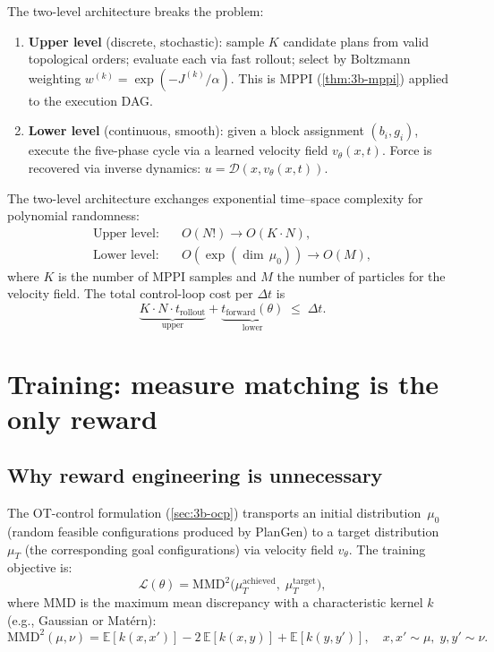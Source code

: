 The two-level architecture breaks the problem:

\begin{definition}\label{def:m-twolevel}
\leavevmode
\begin{enumerate}[label=(\roman*),nosep]
  \item \textbf{Upper level} (discrete, stochastic): sample $K$
  candidate plans from valid topological orders; evaluate each via
  fast rollout; select by Boltzmann weighting
  $w^{(k)} = \exp(-J^{(k)}/\alpha)$.  This is MPPI
  (\cref{thm:3b-mppi}) applied to the execution DAG.
  \item \textbf{Lower level} (continuous, smooth): given a block
  assignment $(b_i, g_i)$, execute the five-phase cycle via a
  learned velocity field $v_\theta(x,t)$.  Force is recovered via
  inverse dynamics: $u = \mathcal{D}(x, v_\theta(x,t))$.
\end{enumerate}
\end{definition}

\begin{proposition}
\label{prop:m-exchange}
The two-level architecture exchanges exponential time--space
complexity for polynomial randomness:
\begin{align}
  \text{Upper level:}\quad & O(N!) \to O(K \cdot N),
    \label{eq:m-upper-complex} \\
  \text{Lower level:}\quad & O(\exp(\dim\,\mu_0)) \to O(M),
    \label{eq:m-lower-complex}
\end{align}
where $K$ is the number of MPPI samples and $M$ the number of
particles for the velocity field.  The total control-loop cost
per $\Delta t$ is
\[
  \underbrace{K \cdot N \cdot t_\mathrm{rollout}}_{\text{upper}}
  + \underbrace{t_\mathrm{forward}(\theta)}_{\text{lower}}
  \;\leq\; \Delta t.
\]
\end{proposition}


\section{Training: measure matching is the only reward}
\label{sec:m-training}

\subsection{Why reward engineering is unnecessary}

The OT-control formulation (\cref{sec:3b-ocp}) transports an
initial distribution~$\mu_0$ (random feasible configurations
produced by PlanGen) to a target distribution~$\mu_T$ (the
corresponding goal configurations) via velocity field $v_\theta$.
The training objective is:
\begin{equation}\label{eq:m-loss}
  \mathcal{L}(\theta)
  = \mathrm{MMD}^2\!\bigl(\mu_T^{\mathrm{achieved}},\;
    \mu_T^{\mathrm{target}}\bigr),
\end{equation}
where $\mathrm{MMD}$ is the maximum mean discrepancy with a
characteristic kernel $k$ (e.g., Gaussian or Mat\'ern):
\[
  \mathrm{MMD}^2(\mu, \nu)
  = \mathbb{E}[k(x,x')] - 2\,\mathbb{E}[k(x,y)]
  + \mathbb{E}[k(y,y')],
  \quad x,x' \sim \mu,\; y,y' \sim \nu.
\]


